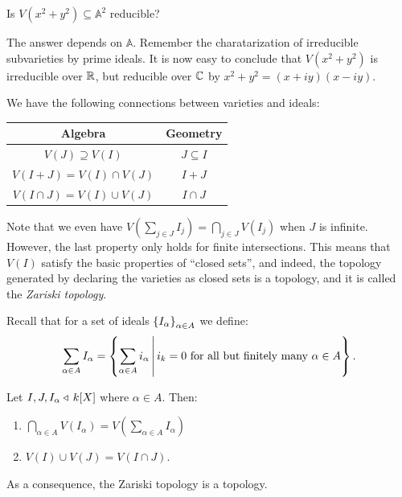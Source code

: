 \documentclass[11pt,a4paper]{article}
\newcommand{\A}{\mathbb A}
\begin{document}
\begin{exercise}
  Is $V(x^2 + y^2) \subseteq \A^2$ reducible?
\end{exercise}
\begin{solution}
  The answer depends on $\A$.
  Remember the charatarization of irreducible subvarieties
  by prime ideals.
  It is now easy to conclude that $V(x^2 + y^2)$ is irreducible over $\mathbb{R}$,
  but reducible over $\mathbb{C}$ by $x^2 + y^2 = (x + iy)(x - iy)$.
\end{solution}

\begin{remark}
  We have the following connections between varieties and ideals:
  \begin{center}
\begin{tabular}{c|c}
Algebra                        & Geometry        \\ \hline
$V(J) \supseteq V(I)$          & $J \subseteq I$ \\
$V(I + J) = V(I) \cap V(J)$    & $I + J$         \\
$V(I \cap J) = V(I) \cup V(J)$ & $I \cap J$     
\end{tabular}
  \end{center}
  Note that we even have $V(\sum_{j \in J} I_j) = \bigcap_{j \in J} V(I_j)$
  when $J$ is infinite.
  However, the last property only holds for finite intersections.
  This means that $V(I)$ satisfy the basic properties of ``closed sets'',
  and indeed, the topology generated by declaring the varieties as closed
  sets is a topology, and it is called the \textit{Zariski topology}.
\end{remark}

\begin{remark}
  Recall that for a set of ideals $\left\{I_{\alpha}\right\}_{\alpha \in A}$
  we define:
  \[
    \sum_{\alpha \in A} I_{\alpha} =
    \left\{\sum_{\alpha \in A} i_{\alpha} \,\middle\vert\,
      i_k = 0 \text{ for all but finitely many } \alpha \in A\right\}.
  \]
\end{remark}

\begin{proposition}
  \label{prop:zariski-topology}
  Let $I,J,I_{\alpha} \triangleleft\, k[X]$
  where $\alpha \in A$.
  Then:
  \begin{enumerate}
    \item[(1)] $\bigcap_{\alpha \in A} V(I_{\alpha}) = V(\sum_{\alpha \in A} I_{\alpha})$
    \item[(2)] $V(I) \cup V(J) = V(I \cap J)$.
  \end{enumerate}
  As a consequence, the Zariski topology is a topology.
\end{proposition}
\end{document}
